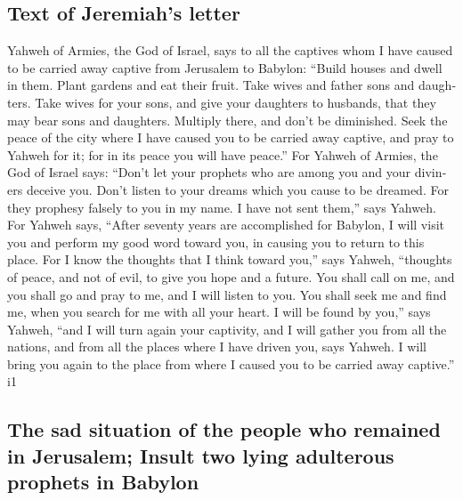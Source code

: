 \begin{paracol}{2}
\begin{otherlanguage}{english}
\hypertarget{text-of-jeremiahs-letter}{%
\subsection{Text of Jeremiah's letter}\label{text-of-jeremiahs-letter}}

 Yahweh of Armies, the God of Israel, says to all the
captives whom I have caused to be carried away captive from Jerusalem to
Babylon:  ``Build houses and dwell in them. Plant gardens
and eat their fruit.  Take wives and father sons and
daughters. Take wives for your sons, and give your daughters to
husbands, that they may bear sons and daughters. Multiply there, and
don't be diminished.  Seek the peace of the city where I
have caused you to be carried away captive, and pray to Yahweh for it;
for in its peace you will have peace.''  For Yahweh of
Armies, the God of Israel says: ``Don't let your prophets who are among
you and your diviners deceive you. Don't listen to your dreams which you
cause to be dreamed.  For they prophesy falsely to you in
my name. I have not sent them,'' says Yahweh.  For Yahweh
says, ``After seventy years are accomplished for Babylon, I will visit
you and perform my good word toward you, in causing you to return to
this place.  For I know the thoughts that I think toward
you,'' says Yahweh, ``thoughts of peace, and not of evil, to give you
hope and a future.  You shall call on me, and you shall
go and pray to me, and I will listen to you.  You shall
seek me and find me, when you search for me with all your heart.
 I will be found by you,'' says Yahweh, ``and I will turn
again your captivity, and I will gather you from all the nations, and
from all the places where I have driven you, says Yahweh. I will bring
you again to the place from where I caused you to be carried away
captive.'' i1

\hypertarget{the-sad-situation-of-the-people-who-remained-in-jerusalem-insult-two-lying-adulterous-prophets-in-babylon}{%
\subsection{The sad situation of the people who remained in Jerusalem;
Insult two lying adulterous prophets in
Babylon}\label{the-sad-situation-of-the-people-who-remained-in-jerusalem-insult-two-lying-adulterous-prophets-in-babylon}}


\end{otherlanguage}
\end{paracol}
